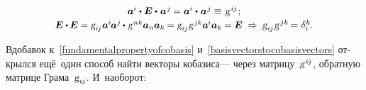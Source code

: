 \begin{otherlanguage}{russian}
\begin{equation}
\begin{array}{c}
\bm{a}^{\hspace{-0.05ex}i} \dotp \bm{E} \dotp \hspace{0.1ex} \bm{a}^{\hspace{0.1ex}j} \hspace{-0.15ex} = \bm{a}^{\hspace{-0.05ex}i} \dotp \hspace{0.1ex} \bm{a}^{\hspace{0.1ex}j} \hspace{-0.15ex} \hspace{0.1ex} \equiv \hspace{0.16ex} \textsl{g}^{\hspace{0.2ex}i\hspace{-0.1ex}j} \hspace{0.1ex} ; \\[0.2em]
%
\scalebox{0.96}[0.97]{$\bm{E} \dotp \hspace{-0.1ex} \bm{E} = \textsl{g}_{i\hspace{-0.1ex}j} \hspace{0.1ex} \bm{a}^{\hspace{-0.05ex}i} \hspace{-0.1ex} \bm{a}^{\hspace{0.05ex}j} \hspace{-0.1ex} \dotp \hspace{0.1ex} \textsl{g}^{\hspace{0.2ex}nk} \bm{a}_n \bm{a}_k \hspace{-0.1ex} = \textsl{g}_{i\hspace{-0.1ex}j} \hspace{0.1ex} \textsl{g}^{\hspace{0.2ex}jk} \bm{a}^{\hspace{-0.05ex}i} \bm{a}_k \hspace{-0.1ex} = \bm{E}$}
\:\Rightarrow\: \textsl{g}_{i\hspace{-0.1ex}j} \hspace{0.1ex} \textsl{g}^{\hspace{0.2ex}jk} \hspace{-0.25ex} = \delta_i^{\hspace{0.05ex}k} \hspace{-0.1ex}.
\end{array}\end{equation}

\vspace{0.1em}\noindent Вдобавок к~\eqref{fundamentalpropertyofcobasis} и~\eqref{basisvectorstocobasisvectors} открылся ещё~один способ найти векторы кобазиса\:--- через матрицу~\hbox{$\textsl{g}^{\hspace{.2ex}i\hspace{-0.1ex}j}$\hspace{-0.3ex}}, обратную матрице Грама~${\textsl{g}_{i\hspace{-0.1ex}j}}$. И~наоборот:


\end{otherlanguage}
